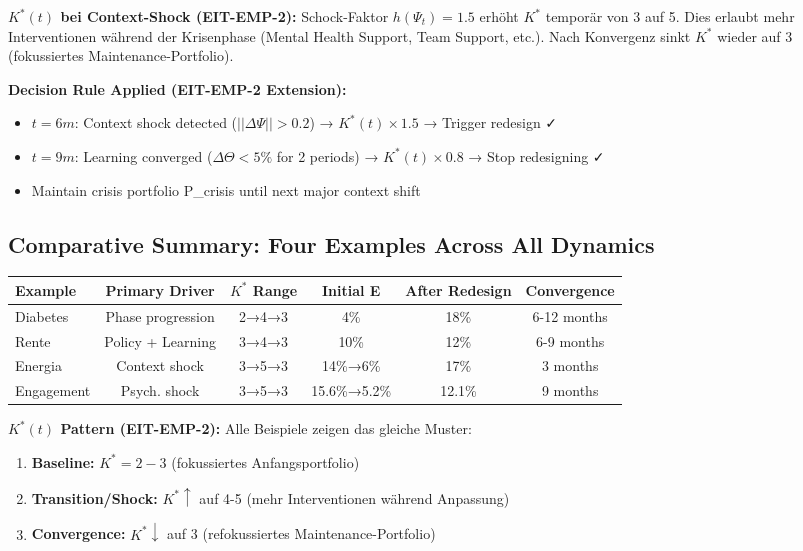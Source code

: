 \textbf{$K^*(t)$ bei Context-Shock (EIT-EMP-2):} Schock-Faktor $h(\Psi_t) = 1.5$ erhöht $K^*$ temporär von 3 auf 5. Dies erlaubt mehr Interventionen während der Krisenphase (Mental Health Support, Team Support, etc.). Nach Konvergenz sinkt $K^*$ wieder auf 3 (fokussiertes Maintenance-Portfolio).

\textbf{Decision Rule Applied (EIT-EMP-2 Extension):}
\begin{itemize}[nosep]
\item $t=6m$: Context shock detected ($||\Delta \Psi|| > 0.2$) → $K^*(t) \times 1.5$ → Trigger redesign ✓
\item $t=9m$: Learning converged ($\Delta \Theta < 5\%$ for 2 periods) → $K^*(t) \times 0.8$ → Stop redesigning ✓
\item Maintain crisis portfolio P\_crisis until next major context shift
\end{itemize}

\subsection{Comparative Summary: Four Examples Across All Dynamics}

\begin{center}
\begin{tabular}{lccccc}
\toprule
\textbf{Example} & \textbf{Primary Driver} & $K^*$ Range & \textbf{Initial E} & \textbf{After Redesign} & \textbf{Convergence} \\
\midrule
Diabetes & Phase progression & 2→4→3 & 4\% & 18\% & 6-12 months \\
Rente & Policy + Learning & 3→4→3 & 10\% & 12\% & 6-9 months \\
Energia & Context shock & 3→5→3 & 14\%→6\% & 17\% & 3 months \\
Engagement & Psych. shock & 3→5→3 & 15.6\%→5.2\% & 12.1\% & 9 months \\
\bottomrule
\end{tabular}
\end{center}

\textbf{$K^*(t)$ Pattern (EIT-EMP-2):} Alle Beispiele zeigen das gleiche Muster:
\begin{enumerate}[nosep]
\item \textbf{Baseline:} $K^* = 2-3$ (fokussiertes Anfangsportfolio)
\item \textbf{Transition/Shock:} $K^* \uparrow$ auf 4-5 (mehr Interventionen während Anpassung)
\item \textbf{Convergence:} $K^* \downarrow$ auf 3 (refokussiertes Maintenance-Portfolio)
\end{enumerate}


